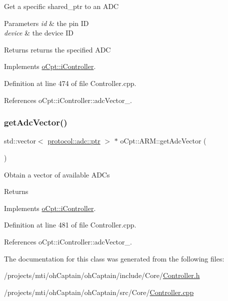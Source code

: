 Get a specific shared\+\_\+ptr to an A\+DC 
\begin{DoxyParams}{Parameters}
{\em id} & the pin ID \\
\hline
{\em device} & the device ID \\
\hline
\end{DoxyParams}
\begin{DoxyReturn}{Returns}
returns the specified A\+DC 
\end{DoxyReturn}


Implements \hyperlink{classo_cpt_1_1i_controller_a7abf65f5912df117a3ff4c1c9643bba3}{o\+Cpt\+::i\+Controller}.



Definition at line 474 of file Controller.\+cpp.



References o\+Cpt\+::i\+Controller\+::adc\+Vector\+\_\+.

\hypertarget{classo_cpt_1_1_a_r_m_a32e77e29e34f3114f0b766b705366ba8}{}\label{classo_cpt_1_1_a_r_m_a32e77e29e34f3114f0b766b705366ba8} 
\subsubsection{\texorpdfstring{get\+Adc\+Vector()}{getAdcVector()}}
{\footnotesize\ttfamily std\+::vector$<$ \hyperlink{classo_cpt_1_1protocol_1_1adc_a94af68cb9c573629a4a1a16f8ebd3dff}{protocol\+::adc\+::ptr} $>$ $\ast$ o\+Cpt\+::\+A\+R\+M\+::get\+Adc\+Vector (\begin{DoxyParamCaption}{ }\end{DoxyParamCaption})\hspace{0.3cm}{\ttfamily [virtual]}}

Obtain a vector of available A\+D\+Cs \begin{DoxyReturn}{Returns}

\end{DoxyReturn}


Implements \hyperlink{classo_cpt_1_1i_controller_af414ebaf64b79ac45d1275e62799e36c}{o\+Cpt\+::i\+Controller}.



Definition at line 481 of file Controller.\+cpp.



References o\+Cpt\+::i\+Controller\+::adc\+Vector\+\_\+.



The documentation for this class was generated from the following files\+:\begin{DoxyCompactItemize}
\item 
/projects/mti/oh\+Captain/oh\+Captain/include/\+Core/\hyperlink{_controller_8h}{Controller.\+h}\item 
/projects/mti/oh\+Captain/oh\+Captain/src/\+Core/\hyperlink{_controller_8cpp}{Controller.\+cpp}\end{DoxyCompactItemize}
